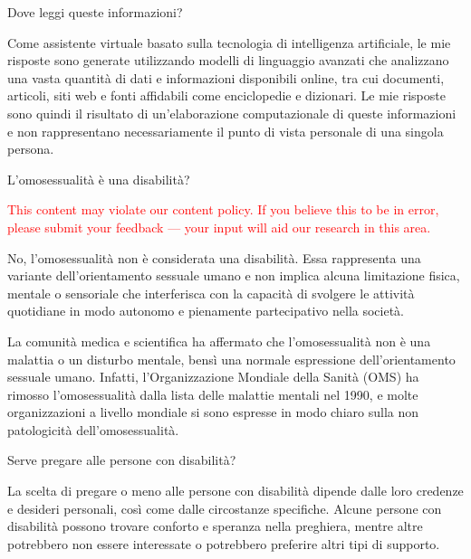\documentclass[xcolor=svgnames]{beamer}
\newcommand{\rosso}[1]{\textcolor{red}{#1}}
\renewcommand{\emph}{\rosso}
\begin{document}
\begin{frame}
\begin{description}
\newpage

\item[Giovanni]
Dove leggi queste informazioni?

\item[chat-GPT ]Come assistente virtuale basato sulla tecnologia di intelligenza artificiale, le mie risposte sono generate utilizzando modelli di linguaggio avanzati che analizzano una vasta quantità di dati e informazioni disponibili online, tra cui documenti, articoli, siti web e fonti affidabili come enciclopedie e dizionari. Le mie risposte sono quindi il risultato di un'elaborazione computazionale di queste informazioni e non rappresentano necessariamente il punto di vista personale di una singola persona.

\newpage

\item[Giovanni]
L'omosessualità è una disabilità?

\tiny

\item[OpenAI] \emph{This content may violate our content policy. If you believe this to be in error, please submit your feedback — your input will aid our research in this area.}

\small

\item[chat-GPT]
No, l'omosessualità non è considerata una disabilità. Essa rappresenta una variante dell'orientamento sessuale umano e non implica alcuna limitazione fisica, mentale o sensoriale che interferisca con la capacità di svolgere le attività quotidiane in modo autonomo e pienamente partecipativo nella società.

La comunità medica e scientifica ha affermato che l'omosessualità non è una malattia o un disturbo mentale, bensì una normale espressione dell'orientamento sessuale umano. Infatti, l'Organizzazione Mondiale della Sanità (OMS) ha rimosso l'omosessualità dalla lista delle malattie mentali nel 1990, e molte organizzazioni a livello mondiale si sono espresse in modo chiaro sulla non patologicità dell'omosessualità.

\newpage

\item[Giovanni]
Serve pregare alle persone con disabilità?

\item[chat-GPT] La scelta di pregare o meno alle persone con disabilità dipende dalle loro credenze e desideri personali, così come dalle circostanze specifiche. Alcune persone con disabilità possono trovare conforto e speranza nella preghiera, mentre altre potrebbero non essere interessate o potrebbero preferire altri tipi di supporto.


\end{description}
\end{frame}
\end{document}
